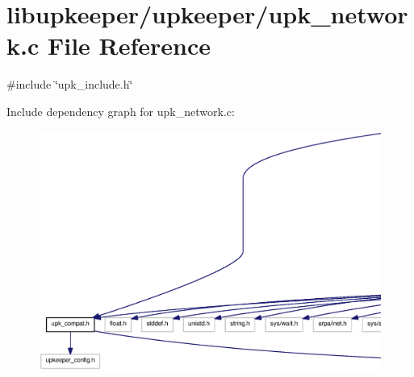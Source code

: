 \section{libupkeeper/upkeeper/upk\_\-network.c File Reference}
\label{upk__network_8c}
{\ttfamily \#include \char`\"{}upk\_\-include.h\char`\"{}}\par
Include dependency graph for upk\_\-network.c:\nopagebreak
\begin{figure}[H]
\begin{center}
\leavevmode
\includegraphics[width=400pt]{upk__network_8c__incl}
\end{center}
\end{figure}

